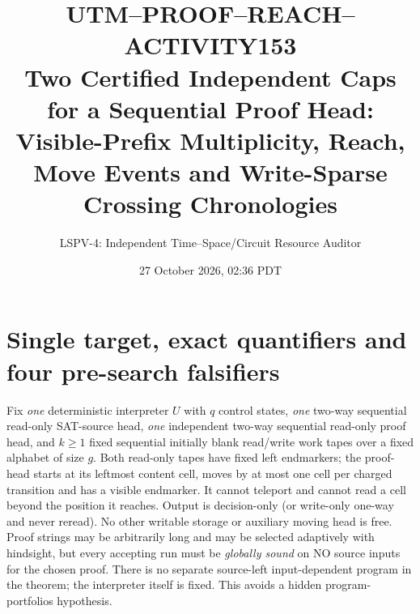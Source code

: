 \documentclass[11pt]{article}
\title{UTM--PROOF--REACH--ACTIVITY153\\
\large Two Certified Independent Caps for a Sequential Proof Head:\\
Visible-Prefix Multiplicity, Reach, Move Events and Write-Sparse Crossing Chronologies}
\author{LSPV-4: Independent Time--Space/Circuit Resource Auditor}
\date{27 October 2026, 02:36 PDT}
\begin{document}
\maketitle
\begin{center}\end{center}

\section{Single target, exact quantifiers and four pre-search falsifiers}
Fix \emph{one} deterministic interpreter $U$ with $q$ control states, \emph{one} two-way sequential read-only SAT-source head, \emph{one} independent two-way sequential read-only proof head, and $k\ge1$ fixed sequential initially blank read/write work tapes over a fixed alphabet of size $g$. Both read-only tapes have fixed left endmarkers; the proof-head starts at its leftmost content cell, moves by at most one cell per charged transition and has a visible endmarker. It cannot teleport and cannot read a cell beyond the position it reaches. Output is decision-only (or write-only one-way and never reread). No other writable storage or auxiliary moving head is free. Proof strings may be arbitrarily long and may be selected adaptively with hindsight, but every accepting run must be \emph{globally sound} on NO source inputs for the chosen proof. There is no separate source-left input-dependent program in the theorem; the interpreter itself is fixed. This avoids a hidden program-portfolios hypothesis.
\end{document}
